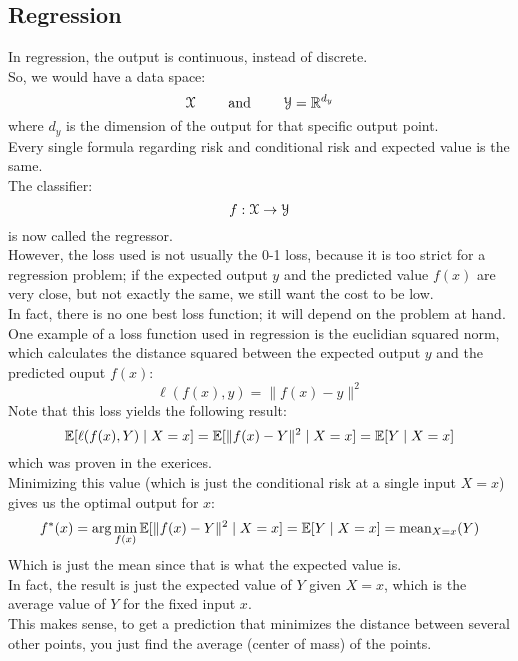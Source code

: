 \documentclass[12pt]{article}
\begin{document}
\newpage

\subsection*{Regression}

In regression, the output is continuous,
instead of discrete. \\

So, we would have a data space:
\[ \mathcal{X}  \qquad \text{ and } \qquad \mathcal{Y} = \mathbb{R}^{d_y}\]
where $d_y$ is the dimension of
the output for that specific output point. \\

Every single formula regarding risk
and conditional risk and expected value
is the same. \\

The classifier:
\[ f: \mathcal{X} \to \mathcal{Y} \]
is now called the regressor. \\

However, the loss used is not usually
the 0-1 loss, because it is too strict
for a regression problem;
if the expected output $y$
and the predicted value $f(x)$
are very close, but not exactly the same,
we still want the cost to be low. \\

In fact, there is no one best loss function;
it will depend on the problem at hand. \\

One example of a loss function used in regression
is the euclidian squared norm,
which calculates the distance squared
between the expected output $y$
and the predicted ouput $f(x)$:
\[ \ell(f(x), y) = \|f(x) - y\|^2 \]
Note that this loss yields the following
result:
\[ \mathbb{E}[\ell(f(x), Y) \mid X = x]
= \mathbb{E}[\|f(x) - Y\|^2  \mid X = x]
= \mathbb{E}[Y \mid X = x] \]
which was proven in the exerices. \\
Minimizing this value (which is
just the conditional risk at a single
input $X = x$)
gives us the optimal output for $x$:
\[ f^*(x) = \arg\min_{f(x)}
\mathbb{E}[\|f(x) - Y\|^2  \mid X = x]
= \mathbb{E}[Y \mid X = x] = \text{mean}_{X=x}(Y) \]
Which is just the mean since that is
what the expected value is. \\

In fact, the result is just the expected
value of $Y$ given $X = x$,
which is the average value of $Y$
for the fixed input $x$. \\
This makes sense, to get a prediction that minimizes
the distance between several other points,
you just find the average (center of mass)
of the points. \\
\end{document}
